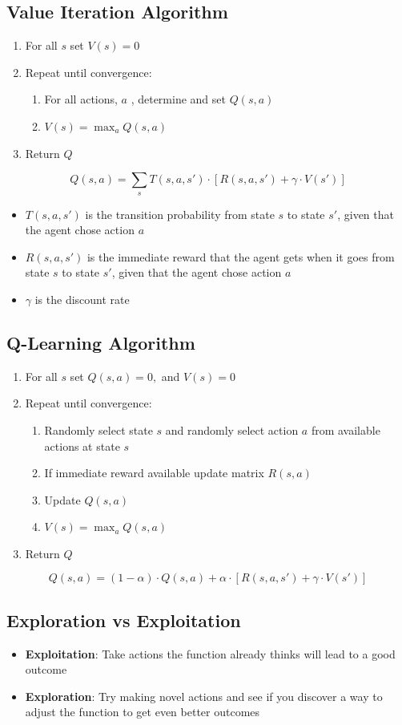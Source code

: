 \documentclass[11pt]{article}
\begin{document}
\subsection{Value Iteration Algorithm }
\begin{enumerate}
\item For all $s$ set $V(s) = 0$
\item Repeat until convergence:
\begin{enumerate}
\item For all actions, $a$ , determine and set $Q(s,a)$
\item $V(s) = \max_a Q(s,a)$
\end{enumerate}
\item Return $Q$
\end{enumerate}
$$ Q(s,a) = \sum_{s} T(s,a,s') \cdot [R(s,a,s')+ \gamma \cdot V(s')]$$
\begin{itemize}
\item $T(s, a, s')$ is the transition probability from state $s$ to state $s'$, given that the agent chose action $a$
\item $R(s, a, s')$ is the immediate reward that the agent gets when it goes from state $s$ to state $s'$, given that the agent chose action $a$
\item $\gamma$ is the discount rate
\end{itemize}
 
\subsection{Q-Learning Algorithm }
\begin{enumerate}
\item For all $s$ set $ Q(s,a) = 0,$ and $V(s) = 0$
\item Repeat until convergence:
\begin{enumerate}
\item Randomly select state $s$ and randomly select action $a$ from available actions at state $s$
\item If immediate reward available update matrix $R(s,a)$
\item Update $Q(s,a)$
\item $V(s) = \max_a Q(s,a)$
\end{enumerate}
\item Return $Q$
\end{enumerate}
$$ Q(s,a) =(1-\alpha)\cdot Q(s,a) + \alpha \cdot [R(s,a,s')+ \gamma \cdot V(s')]$$

\subsection{Exploration vs Exploitation}
\begin{itemize}
\item \textbf{Exploitation}: Take actions the function already thinks will lead to a good outcome
\item \textbf{Exploration}: Try making novel actions and see if you discover a way to adjust the function to get even better outcomes
\end{itemize}
\end{document}
